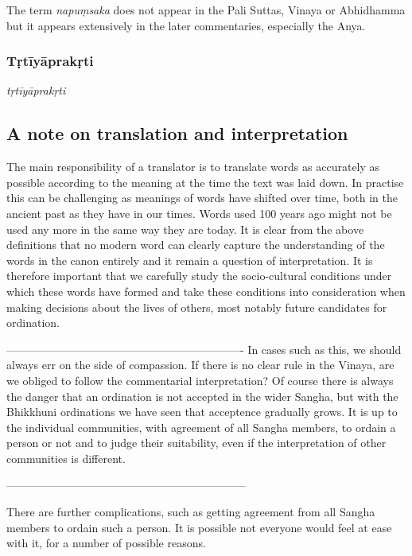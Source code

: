 \medskip


The term {\em napuṃsaka} does not appear in the Pali Suttas, Vinaya or Abhidhamma but it appears extensively in the later commentaries, especially the Anya. 

\subsubsection{Tṛtīyāprakṛti}

{\em tṛtīyāprakṛti}


\subsection{A note on translation and interpretation}
The main responsibility of a translator is to translate words as accurately as possible according to the meaning at the time the text was laid down. In practise this can be challenging as meanings of words have shifted over time, both in the ancient past as they have in our times. Words used 100 years ago might not be used any more in the same way they are today. It is clear from the above definitions that no modern word can clearly capture the understanding of the words in the canon entirely and it remain a question of interpretation. It is therefore important that we carefully study the socio-cultural conditions under which these words have formed and take these conditions into consideration when making decisions about the lives of others, most notably future candidates for ordination.


----------------------------------------------------------------
In cases such as this, we should always err on the side of compassion. If there is no clear rule in the Vinaya, are we obliged to follow the commentarial interpretation? Of course there is always the danger that an ordination is not accepted in the wider Sangha, but with the Bhikkhuni ordinations we have seen that acceptence gradually grows. It is up to the individual communities, with agreement of all Sangha members, to ordain a person or not and to judge their suitability, even if the interpretation of other communities is different. 



-----------------------------------------------------------------




There are further complications, such as getting agreement from all Sangha members to ordain such a person. It is possible not everyone would feel at ease with it, for a number of possible reasons.


